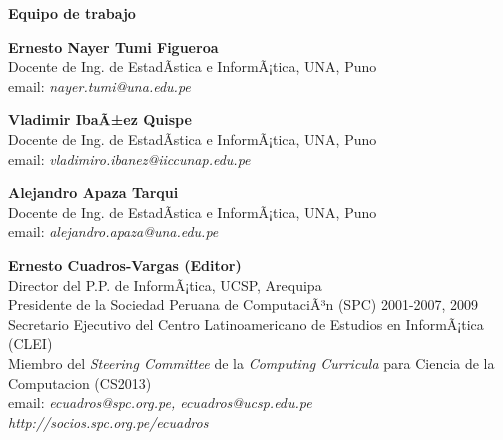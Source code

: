 \begin{center}
{\bf \Huge Equipo de trabajo}
\end{center}
\vspace{1cm}

\begin{center}
\textbf{Ernesto Nayer Tumi Figueroa}\\
Docente de Ing. de EstadÃ­stica e InformÃ¡tica, UNA, Puno\\
email: \textit{nayer.tumi@una.edu.pe}\\
\end{center}

\begin{center}
\textbf{Vladimir IbaÃ±ez Quispe}\\
Docente de Ing. de EstadÃ­stica e InformÃ¡tica, UNA, Puno\\
email: \textit{vladimiro.ibanez@iiccunap.edu.pe}\\
\end{center}

\begin{center}
\textbf{Alejandro Apaza Tarqui}\\
Docente de Ing. de EstadÃ­stica e InformÃ¡tica, UNA, Puno\\
email: \textit{alejandro.apaza@una.edu.pe}\\
\end{center}

% 

\begin{center}
\textbf{Ernesto Cuadros-Vargas (Editor)}\\
Director del P.P. de InformÃ¡tica, UCSP, Arequipa\\ %
Presidente de la Sociedad Peruana de ComputaciÃ³n (SPC) 2001-2007, 2009\\
Secretario Ejecutivo del Centro Latinoamericano de Estudios en InformÃ¡tica (CLEI)\\
Miembro del {\it Steering Committee} de la {\it Computing Curricula} para Ciencia de la Computacion (CS2013) \\
email: \textit{ecuadros@spc.org.pe, ecuadros@ucsp.edu.pe}\\
\textit{http://socios.spc.org.pe/ecuadros}
\end{center}

